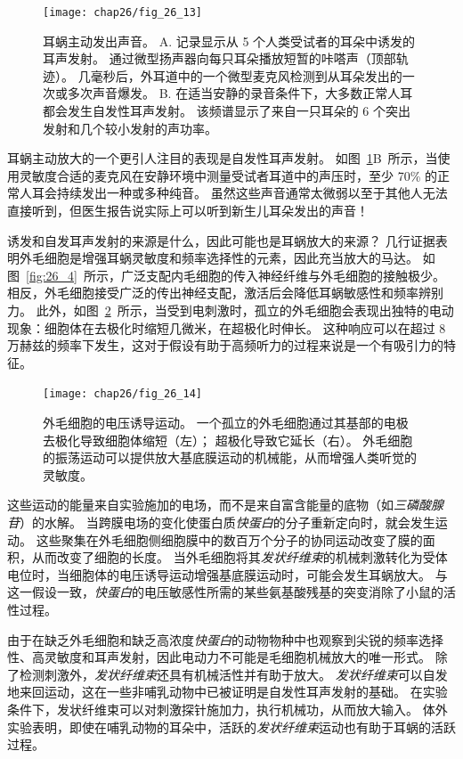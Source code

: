 \begin{figure}[htbp]
	\centering
	\texttt{[image: chap26/fig\_26\_13]}
	\caption{耳蜗主动发出声音。
		A. 记录显示从 5 个人类受试者的耳朵中诱发的耳声发射。
		通过微型扬声器向每只耳朵播放短暂的咔嗒声（顶部轨迹）。
		几毫秒后，外耳道中的一个微型麦克风检测到从耳朵发出的一次或多次声音爆发\cite{wilson1980evidence}。
		B. 在适当安静的录音条件下，大多数正常人耳都会发生自发性耳声发射。
		该频谱显示了来自一只耳朵的 6 个突出发射和几个较小发射的声功率\cite{murphy1995relaxation}。}
	\label{fig:26_13}
\end{figure}


耳蜗主动放大的一个更引人注目的表现是自发性耳声发射。
如图~\ref{fig:26_13}B~所示，当使用灵敏度合适的麦克风在安静环境中测量受试者耳道中的声压时，至少 70\% 的正常人耳会持续发出一种或多种纯音。
虽然这些声音通常太微弱以至于其他人无法直接听到，但医生报告说实际上可以听到新生儿耳朵发出的声音！


诱发和自发耳声发射的来源是什么，因此可能也是耳蜗放大的来源？
几行证据表明外毛细胞是增强耳蜗灵敏度和频率选择性的元素，因此充当放大的马达。
如图~\ref{fig:26_4}~所示，广泛支配内毛细胞的传入神经纤维与外毛细胞的接触极少。
相反，外毛细胞接受广泛的传出神经支配，激活后会降低耳蜗敏感性和频率辨别力。
此外，如图~\ref{fig:26_14}~所示，当受到电刺激时，孤立的外毛细胞会表现出独特的电动现象：细胞体在去极化时缩短几微米，在超极化时伸长。
这种响应可以在超过 8 万赫兹的频率下发生，这对于假设有助于高频听力的过程来说是一个有吸引力的特征。


\begin{figure}[htbp]
	\centering
	\texttt{[image: chap26/fig\_26\_14]}
	\caption{外毛细胞的电压诱导运动。
		一个孤立的外毛细胞通过其基部的电极去极化导致细胞体缩短（左）； 
		超极化导致它延长（右）。
		外毛细胞的振荡运动可以提供放大基底膜运动的机械能，从而增强人类听觉的灵敏度。}
	\label{fig:26_14}
\end{figure}


这些运动的能量来自实验施加的电场，而不是来自富含能量的底物（如\textit{三磷酸腺苷}）的水解。
当跨膜电场的变化使蛋白质\textit{快蛋白}的分子重新定向时，就会发生运动。
这些聚集在外毛细胞侧细胞膜中的数百万个分子的协同运动改变了膜的面积，从而改变了细胞的长度。
当外毛细胞将其\textit{发状纤维束}的机械刺激转化为受体电位时，当细胞体的电压诱导运动增强基底膜运动时，可能会发生耳蜗放大。
与这一假设一致，\textit{快蛋白}的电压敏感性所需的某些氨基酸残基的突变消除了小鼠的活性过程。


由于在缺乏外毛细胞和缺乏高浓度\textit{快蛋白}的动物物种中也观察到尖锐的频率选择性、高灵敏度和耳声发射，因此电动力不可能是毛细胞机械放大的唯一形式。
除了检测刺激外，\textit{发状纤维束}还具有机械活性并有助于放大。
\textit{发状纤维束}可以自发地来回运动，这在一些非哺乳动物中已被证明是自发性耳声发射的基础。
在实验条件下，发状纤维束可以对刺激探针施加力，执行机械功，从而放大输入。
体外实验表明，即使在哺乳动物的耳朵中，活跃的\textit{发状纤维束}运动也有助于耳蜗的活跃过程。


